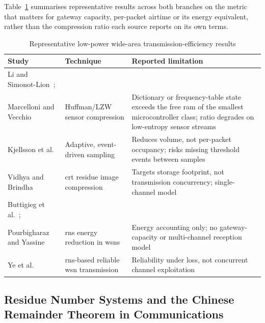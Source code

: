 \documentclass[12pt,a4paper,oneside]{book}
\begin{document}
Table~\ref{tab:lit-lpwan-comparison} summarises representative results
across both branches on the metric that matters for gateway capacity,
per-packet airtime or its energy equivalent, rather than the compression
ratio each source reports on its own terms.

\begin{table}[htbp]
\centering
\caption{Representative low-power wide-area transmission-efficiency results}
\label{tab:lit-lpwan-comparison}
\footnotesize
\begin{tabularx}{\textwidth}{@{}p{}p{}X@{}}
\toprule
\textbf{Study} & \textbf{Technique} & \textbf{Reported limitation} \\
\midrule
Li and Simonot-Lion~\cite{li2018lossless};\\ Marcelloni and Vecchio~\cite{marcelloni2009energy}
  & Huffman/LZW sensor compression
  & Dictionary or frequency-table state exceeds the free \gls{ram} of the
    smallest microcontroller class; ratio degrades on low-entropy sensor
    streams \\
\midrule
Kjellsson et al.~\cite{kjellsson2008adaptive}
  & Adaptive, event-driven sampling
  & Reduces volume, not per-packet occupancy; risks missing threshold
    events between samples \\
\midrule
Vidhya and Brindha~\cite{vidhya2021crt,crtcompression2018}
  & \gls{crt} residue image compression
  & Targets storage footprint, not transmission concurrency; single-channel
    model \\
\midrule
Buttigieg et al.~\cite{khan2023fuzzycrt};\\ Pourbigharaz and Yassine~\cite{rahman2022rnsenergy}
  & \gls{rns} energy reduction in \glspl{wsn}
  & Energy accounting only; no gateway-capacity or multi-channel reception
    model \\
\midrule
Ye et al.~\cite{djeddi2025parallelCRT}
  & \gls{rns}-based reliable \gls{wsn} transmission
  & Reliability under loss, not concurrent channel exploitation \\
\bottomrule
\end{tabularx}
\end{table}

\subsection{Residue Number Systems and the Chinese Remainder Theorem in
Communications}
\label{subsec:lit_crt}
\end{document}
